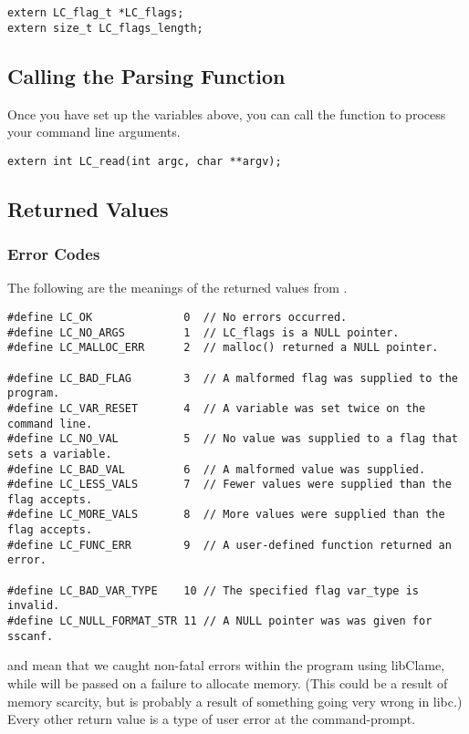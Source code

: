 \begin{verbatim}
extern LC_flag_t *LC_flags;
extern size_t LC_flags_length;
\end{verbatim}

\subsection{Calling the Parsing Function}

Once you have set up the variables above, you can call the  function to process your command line arguments.

\begin{verbatim}
extern int LC_read(int argc, char **argv);
\end{verbatim}

\subsection{Returned Values}

\subsubsection{Error Codes}

The following are the meanings of the returned values from .

\begin{verbatim}
#define LC_OK              0  // No errors occurred.
#define LC_NO_ARGS         1  // LC_flags is a NULL pointer.
#define LC_MALLOC_ERR      2  // malloc() returned a NULL pointer.

#define LC_BAD_FLAG        3  // A malformed flag was supplied to the program.
#define LC_VAR_RESET       4  // A variable was set twice on the command line.
#define LC_NO_VAL          5  // No value was supplied to a flag that sets a variable.
#define LC_BAD_VAL         6  // A malformed value was supplied.
#define LC_LESS_VALS       7  // Fewer values were supplied than the flag accepts.
#define LC_MORE_VALS       8  // More values were supplied than the flag accepts.
#define LC_FUNC_ERR        9  // A user-defined function returned an error.

#define LC_BAD_VAR_TYPE    10 // The specified flag var_type is invalid.
#define LC_NULL_FORMAT_STR 11 // A NULL pointer was was given for sscanf.
\end{verbatim}

 and  mean that we caught non-fatal errors within the program using libClame, while  will be passed on a failure to allocate memory. (This could be a result of memory scarcity, but is probably a result of something going very wrong in libc.) Every other return value is a type of user error at the command-prompt.

